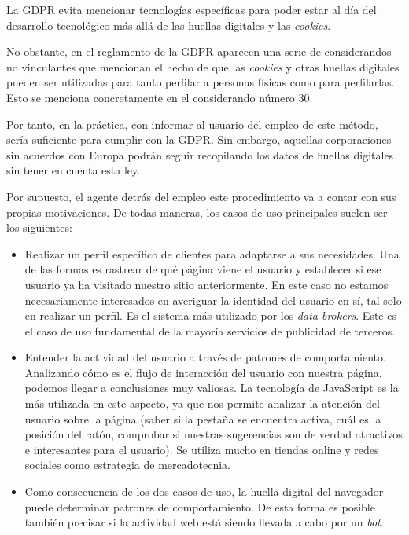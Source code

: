 La GDPR evita mencionar tecnologías específicas para poder estar al día del desarrollo tecnológico más allá de las huellas digitales y las \textit{cookies}\cite{gdpr_eff}. \par 

No obstante, en el reglamento de la GDPR aparecen una serie de considerandos no vinculantes que mencionan el hecho de que las \textit{cookies} y otras huellas digitales pueden ser utilizadas para tanto perfilar a personas físicas como para perfilarlas. Esto se menciona concretamente en el considerando número 30\cite{gdpr}. \par 

Por tanto, en la práctica, con informar al usuario del empleo de este método, sería suficiente para cumplir con la GDPR\cite{blokt}. Sin embargo, aquellas corporaciones sin acuerdos con Europa podrán seguir recopilando los datos de huellas digitales sin tener en cuenta esta ley. \par

Por supuesto, el agente detrás del empleo este procedimiento va a contar con sus propias motivaciones. De todas maneras, los casos de uso principales suelen ser los siguientes: \par

\begin{itemize}
	\item Realizar un perfil específico de clientes para adaptarse a sus necesidades. Una de las formas es rastrear de qué página viene el usuario y establecer si ese usuario ya ha visitado nuestro sitio anteriormente. En este caso no estamos necesariamente interesados en averiguar la identidad del usuario en sí, tal solo en realizar un perfil. Es el sistema más utilizado por los \textit{data brokers}\cite{data_brocker}. Este es el caso de uso fundamental de la mayoría servicios de publicidad de terceros.
	
	\item Entender la actividad del usuario a través de patrones de comportamiento. Analizando cómo es el flujo de interacción del usuario con nuestra página, podemos llegar a conclusiones muy valiosas. La tecnología de JavaScript es la más utilizada en este aspecto, ya que nos permite analizar la atención del usuario sobre la página (saber si la pestaña se encuentra activa, cuál es la posición del ratón, comprobar si nuestras sugerencias son de verdad atractivos e interesantes para el usuario). Se utiliza mucho en tiendas online y redes sociales como estrategia de mercadotecnia.
	
	\item Como consecuencia de los dos casos de uso, la huella digital del navegador puede determinar patrones de comportamiento. De esta forma es posible también precisar si la actividad web está siendo llevada a cabo por un \textit{bot}\cite{bot_paper}.
\end{itemize}

